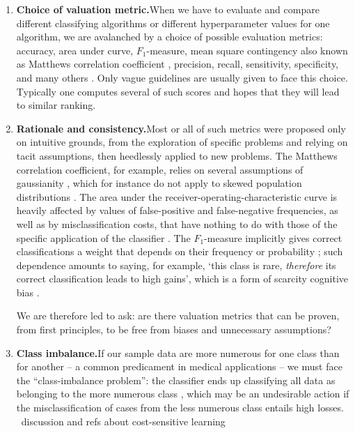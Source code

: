 \documentclass[\ifafour a4paper,12pt,\else a5paper,10pt,\fi%
onecolumn,oneside,article,%
british%
]{memoir}
\theoremstyle{remark}
\theoremstyle{innote}
\renewcommand*{\|}[1][]{\nonscript\:#1\vert\nonscript\:\mathopen{}}
\newcommand*{\sect}{\S}%
\newcommand*{\wrench}{{\fontencoding{U}\fontfamily{fontawesomethree}\selectfont\symbol{114}}}
\newcommand{\mynote}[1]{ {\color{notecolour}#1}}
\begin{document}
\begin{enumerate}[label=\textbf{\textsf{i\arabic*}},ref=\textbf{\textsf{i\arabic*}},itemsep=\parsep]
  
\item\label{item:metrics}\textsf{\textbf{Choice of valuation metric.}}\enspace When we have to evaluate and compare different classifying algorithms or different hyperparameter values for one algorithm, we are avalanched by a choice of possible evaluation metrics: accuracy, area under curve, $F_{1}$-measure, mean square contingency \autocites[denoted \enquote{$r$} there]{yule1912} also known as Matthews correlation coefficient \autocites{matthews1975}[\sect~31 p.~183]{fisher1925_r1963}, precision, recall, sensitivity, specificity, and many others \autocites{sammutetal2011_r2017}[see also the analysis in ][]{goodmanetal1954,goodmanetal1959,goodmanetal1963,goodmanetal1972b}. Only vague guidelines are usually given to face this choice. Typically one computes several of such scores and hopes that they will lead to similar ranking.

\item\label{item:rationale}\textsf{\textbf{Rationale and consistency.}}\enspace Most or all of such metrics were proposed only on intuitive grounds, from the exploration of specific problems and relying on tacit assumptions, then heedlessly applied to new problems. The Matthews correlation coefficient, for example, relies on several assumptions of gaussianity \autocites[\sect~31 p.~183 first paragraph]{fisher1925_r1963}, which for instance do not apply to skewed population distributions \autocites{jenietal2013,zhu2020}. The area under the receiver-operating-characteristic curve is heavily affected by values of false-positive and false-negative frequencies, as well as by misclassification costs, that have nothing to do with those of the specific application of the classifier \autocites{bakeretal2001,loboetal2008}. The $F_{1}$-measure implicitly gives correct classifications a weight that depends on their frequency or probability \autocites{handetal2018}; such dependence amounts to saying, for example, \enquote*{this class is rare, \emph{therefore} its correct classification leads to high gains}, which is a form of scarcity cognitive bias \autocites{camereretal1989,kimetal1999,mittoneetal2009}.

  We are therefore led to ask: are there valuation metrics that can be proven, from first principles, to be free from biases and unnecessary assumptions?

\item\label{item:class_imbal}\textsf{\textbf{Class imbalance.}}\enspace  If our sample data are more numerous for one class than for another -- a common predicament in medical applications -- we must face the \enquote{class-imbalance problem}: the classifier ends up classifying all data as belonging to the more numerous class \autocites{sammutetal2011_r2017,provost2000}, which may be an undesirable action if the misclassification of cases from the less numerous class entails high losses. \mynote{\wrench\ discussion and refs about cost-sensitive learning}
  

\end{enumerate}
\end{document}
